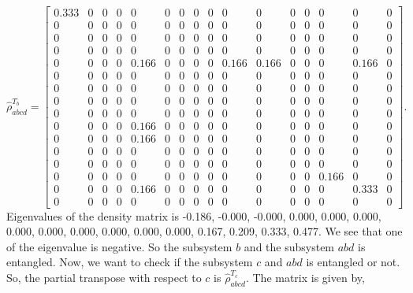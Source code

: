 \documentclass{amsart}
\theoremstyle{plain}
\theoremstyle{definition}
\theoremstyle{plain}
\begin{document}
\begin{equation*}
	\hat{\rho}^{T_b}_{abcd} = \left[\begin{array}{cccccccccccccccc}0.333 & 0 & 0 & 0 & 0 & 0 & 0 & 0 & 0 & 0 & 0 & 0 & 0 & 0 & 0 & 0\\0 & 0 & 0 & 0 & 0 & 0 & 0 & 0 & 0 & 0 & 0 & 0 & 0 & 0 & 0 & 0\\0 & 0 & 0 & 0 & 0 & 0 & 0 & 0 & 0 & 0 & 0 & 0 & 0 & 0 & 0 & 0\\0 & 0 & 0 & 0 & 0 & 0 & 0 & 0 & 0 & 0 & 0 & 0 & 0 & 0 & 0 & 0\\0 & 0 & 0 & 0 & 0.166 & 0 & 0 & 0 & 0 & 0.166 & 0.166 & 0 & 0 & 0 & 0.166 & 0\\0 & 0 & 0 & 0 & 0 & 0 & 0 & 0 & 0 & 0 & 0 & 0 & 0 & 0 & 0 & 0\\0 & 0 & 0 & 0 & 0 & 0 & 0 & 0 & 0 & 0 & 0 & 0 & 0 & 0 & 0 & 0\\0 & 0 & 0 & 0 & 0 & 0 & 0 & 0 & 0 & 0 & 0 & 0 & 0 & 0 & 0 & 0\\0 & 0 & 0 & 0 & 0 & 0 & 0 & 0 & 0 & 0 & 0 & 0 & 0 & 0 & 0 & 0\\0 & 0 & 0 & 0 & 0.166 & 0 & 0 & 0 & 0 & 0 & 0 & 0 & 0 & 0 & 0 & 0\\0 & 0 & 0 & 0 & 0.166 & 0 & 0 & 0 & 0 & 0 & 0 & 0 & 0 & 0 & 0 & 0\\0 & 0 & 0 & 0 & 0 & 0 & 0 & 0 & 0 & 0 & 0 & 0 & 0 & 0 & 0 & 0\\0 & 0 & 0 & 0 & 0 & 0 & 0 & 0 & 0 & 0 & 0 & 0 & 0 & 0 & 0 & 0\\0 & 0 & 0 & 0 & 0 & 0 & 0 & 0 & 0 & 0 & 0 & 0 & 0 & 0.166 & 0 & 0\\0 & 0 & 0 & 0 & 0.166 & 0 & 0 & 0 & 0 & 0 & 0 & 0 & 0 & 0 & 0.333 & 0\\0 & 0 & 0 & 0 & 0 & 0 & 0 & 0 & 0 & 0 & 0 & 0 & 0 & 0 & 0 & 0\end{array}\right]
	.
\end{equation*}
Eigenvalues of the density matrix is -0.186, -0.000, -0.000, 0.000, 0.000, 0.000, 0.000, 0.000, 0.000, 0.000, 0.000, 0.000, 0.167, 0.209, 0.333, 0.477. We see that one of the eigenvalue is negative. So the subsystem $b$ and the subsystem $abd$ is entangled. Now, we want to check if the subsystem $c$ and $abd$ is entangled or not. So, the partial transpose with respect to $c$ is $\hat{\rho}^{T_c}_{abcd}$. The matrix is given by, 
\end{document}
